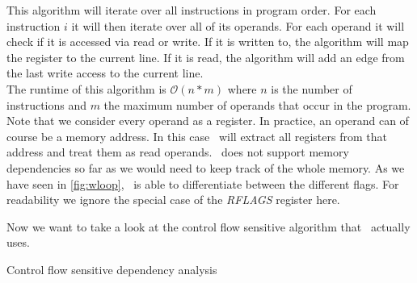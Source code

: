 This algorithm will iterate over all instructions in program order. For each instruction $i$ it will then iterate over all of its operands. For each operand it will check if it is accessed via read or write. If it is written to, the algorithm will map the register to the current line. If it is read, the algorithm will add an edge from the last write access to the current line.\\

The runtime of this algorithm is $\mathcal{O}(n*m)$ where $n$ is the number of instructions and $m$ the maximum number of operands that occur in the program.\\

Note that we consider every operand as a register. In practice, an operand can of course be a memory address. In this case \suaca\ will extract all registers from that address and treat them as read operands. \suaca\ does not support memory dependencies so far as we would need to keep track of the whole memory. As we have seen in \autoref{fig:wloop}, \suaca\ is able to differentiate between the different flags. For readability we ignore the special case of the \emph{RFLAGS} register here.

Now we want to take a look at the control flow sensitive algorithm that \suaca\ actually uses. 
\newpage

\begin{algorithm}[H]
    \SetAlgoLined
    \caption{Control flow sensitive dependency analysis}
    \label{alg:dep}
\end{algorithm}
\vspace{5pt}

